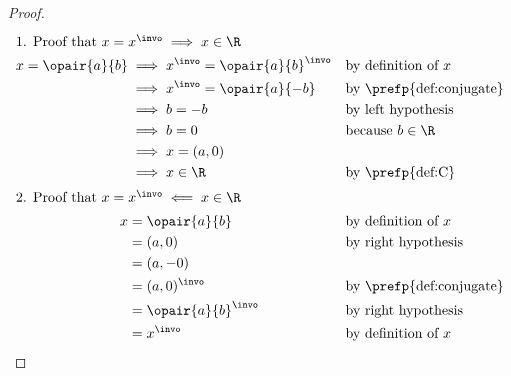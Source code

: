 \begin{theorem}
\label{thm:conj_real}
\end{theorem}
\begin{proof}
\begin{align*}
  \intertext{1. Proof that $x=x^\invo\implies x\in\R$}
    x = \opair{a}{b}
      &\implies x^\invo = \opair{a}{b}^\invo
      &&        \text{by definition of $x$}
    \\&\implies x^\invo = \opair{a}{-b}
      &&        \text{by \prefp{def:conjugate}}
    \\&\implies b = -b
      &&        \text{by left hypothesis}
    \\&\implies b = 0
      &&        \text{because $b\in\R$}
    \\&\implies x=(a,0)
    \\&\implies x\in\R
      &&        \text{by \prefp{def:C}}
    \\
  \intertext{2. Proof that $x=x^\invo\impliedby x\in\R$}
    x
      &= \opair{a}{b}
      && \text{by definition of $x$}
    \\&= (a,0)
      && \text{by right hypothesis}
    \\&= (a,-0)
    \\&= (a,0)^\invo
      && \text{by \prefp{def:conjugate}}
    \\&= \opair{a}{b}^\invo
      && \text{by right hypothesis}
    \\&= x^\invo
      && \text{by definition of $x$}
\end{align*}
\end{proof}


